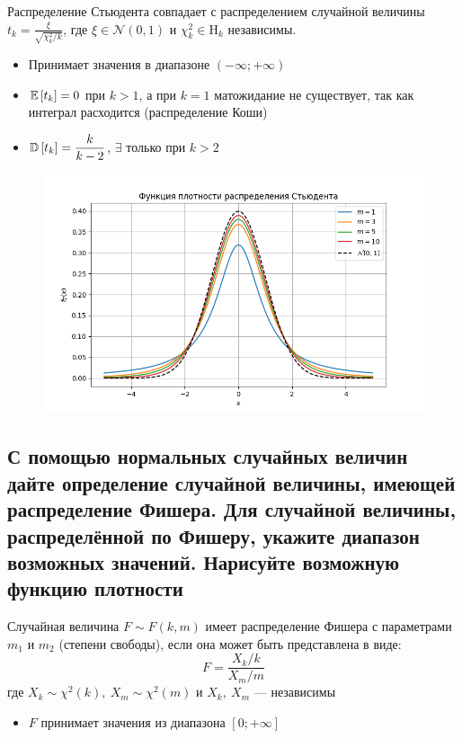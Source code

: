 \documentclass{article}
\begin{document}
Распределение Стьюдента совпадает с распределением случайной величины $t_k=\frac{\xi}{\sqrt{\chi_k^2 / k}}$, где $\xi \in \mathcal{N}(0,1)$ и $\chi_k^2 \in \mathrm{H}_k$ независимы.
\begin{itemize}
    \item Принимает значения в диапазоне $(-\infty;+\infty)$
    \item $\mathbb{E}\left[t_k\right]=0$ при $k>1$, а при $k=1$ матожидание не существует, так как интеграл расходится (распределение Коши)
    \item $\mathbb{D}\left[t_k\right]=\displaystyle\frac{k}{k-2}$, $\exists$ только при $k>2$
\end{itemize}

\begin{figure}[h]
    \centering
    \includegraphics[width=0.8\linewidth]{student.png}
\end{figure}


\newpage
\subsection{С помощью нормальных случайных величин дайте определение случайной величины, имеющей распределение Фишера. Для случайной величины, распределённой по Фишеру, укажите диапазон возможных значений. Нарисуйте возможную функцию плотности}
 Случайная величина $F\sim F(k,m)$ имеет распределение Фишера с параметрами $m_1$ и $m_2$ (степени свободы), если она может быть представлена в виде:
\begin{equation*}
    F = \frac{X_k/k}{X_m/m}
\end{equation*}
где $X_k\sim\chi^2(k),\ X_m\sim\chi^2(m)$ и $X_k,\ X_m$ — независимы

\begin{itemize}
    \item $F$ принимает значения из диапазона $[0;+\infty]$
\end{itemize}
\end{document}
